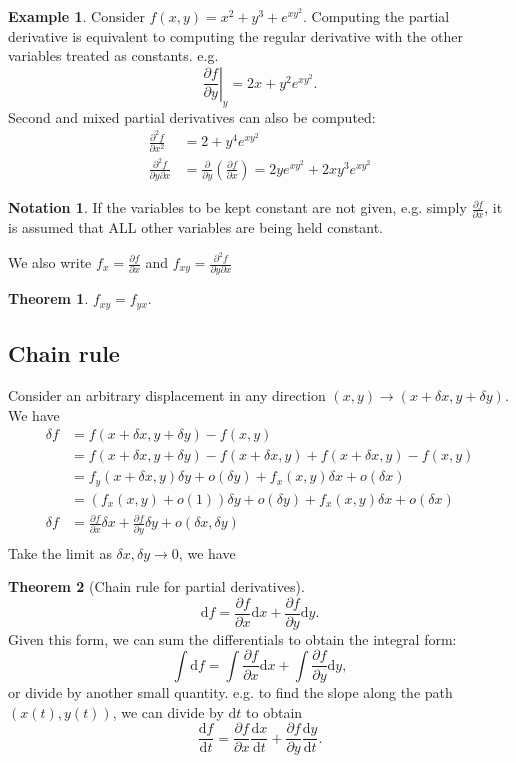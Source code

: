 \documentclass[a4paper]{article}
\theoremstyle{definition}
\newtheorem*{thm}{Theorem}
\newtheorem*{eg}{Example}
\newtheorem*{notation}{Notation}
\renewcommand{\d}{\mathrm{d}}
\begin{document}
\begin{eg}
  Consider $f(x, y) = x^2 + y^3 + e^{xy^2}$. Computing the partial derivative is equivalent to computing the regular derivative with the other variables treated as constants. e.g.
  \[
  \left.\frac{\partial f}{\partial y}\right|_y = 2x + y^2e^{xy^2}.
  \]
Second and mixed partial derivatives can also be computed:
\begin{align*}
  \frac{\partial^2f}{\partial x^2} &= 2 + y^4e^{xy^2}\\
  \frac{\partial^2 f}{\partial y\partial x} &= \frac{\partial}{\partial y}\left(\frac{\partial f}{\partial x}\right) = 2ye^{xy^2} + 2xy^{3}e^{xy^2}
\end{align*}

\end{eg}
\begin{notation}
  If the variables to be kept constant are not given, e.g. simply $\frac{\partial f}{\partial x}$, it is assumed that ALL other variables are being held constant.

  We also write $f_x = \frac{\partial f}{\partial x}$ and $f_{xy} = \frac{\partial^2 f}{\partial y\partial x}$
\end{notation}
\begin{thm}
  $f_{xy} = f_{yx}$.
\end{thm}
\subsection{Chain rule}
Consider an arbitrary displacement in any direction $(x, y) \to (x+\delta x, y + \delta y)$. We have
\begin{align*}
  \delta f &= f(x+\delta x, y + \delta y) - f(x, y)\\
  &= f(x+\delta x, y + \delta y) - f(x + \delta x, y) + f(x+\delta x, y) - f(x, y)\\
  &= f_y(x + \delta x, y)\delta y + o(\delta y) + f_x(x, y)\delta x + o(\delta x)\\
  &= (f_x(x, y) + o(1))\delta y + o(\delta y) + f_x(x, y)\delta x + o(\delta x)\\
  \delta f&= \frac{\partial f}{\partial x}\delta x + \frac{\partial f}{\partial y}\delta y + o(\delta x, \delta y)\\
\end{align*}
Take the limit as $\delta x, \delta y \to 0$, we have 
\begin{thm}[Chain rule for partial derivatives]
  \[
  \d f = \frac{\partial f}{\partial x}\d x + \frac{\partial f}{\partial y}\d y.
  \]
  Given this form, we can sum the differentials to obtain the integral form:
  \[
  \int \d f = \int \frac{\partial f}{\partial x}\d x + \int \frac{\partial f}{\partial y}\d y,
  \]
  or divide by another small quantity. e.g. to find the slope along the path $(x(t), y(t))$, we can divide by $\d t$ to obtain
  \[
  \frac{\d f}{\d t} = \frac{\partial f}{\partial x}\frac{\d x}{\d t} + \frac{\partial f}{\partial y}\frac{\d y}{\d t}.
  \]
\end{thm}
\end{document}
